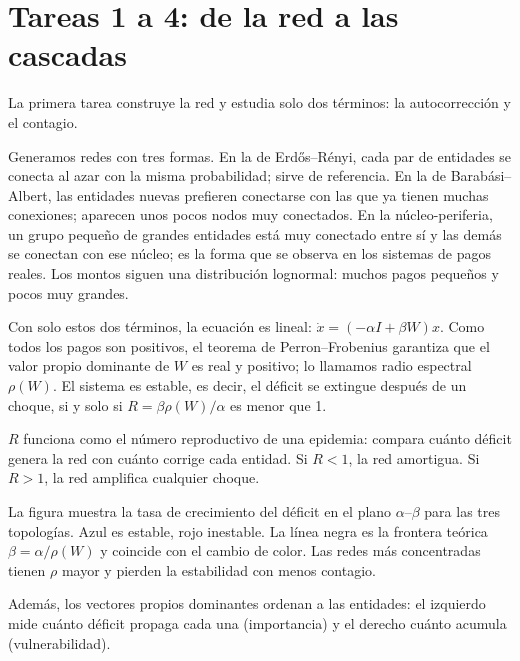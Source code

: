 \section{Tareas 1 a 4: de la red a las cascadas}

\begin{decir}
La primera tarea construye la red y estudia solo dos términos: la autocorrección y el
contagio.

Generamos redes con tres formas. En la de Erdős–Rényi, cada par de entidades se conecta
al azar con la misma probabilidad; sirve de referencia. En la de Barabási–Albert, las
entidades nuevas prefieren conectarse con las que ya tienen muchas conexiones; aparecen
unos pocos nodos muy conectados. En la núcleo-periferia, un grupo pequeño de grandes
entidades está muy conectado entre sí y las demás se conectan con ese núcleo; es la
forma que se observa en los sistemas de pagos reales. Los montos siguen una distribución
lognormal: muchos pagos pequeños y pocos muy grandes.

Con solo estos dos términos, la ecuación es lineal: $\dot x=(-\alpha I+\beta W)x$. Como
todos los pagos son positivos, el teorema de Perron–Frobenius garantiza que el valor
propio dominante de $W$ es real y positivo; lo llamamos radio espectral $\rho(W)$. El
sistema es estable, es decir, el déficit se extingue después de un choque, si y solo si
$R=\beta\rho(W)/\alpha$ es menor que 1.

$R$ funciona como el número reproductivo de una epidemia: compara cuánto déficit genera
la red con cuánto corrige cada entidad. Si $R<1$, la red amortigua. Si $R>1$, la red
amplifica cualquier choque.

La figura muestra la tasa de crecimiento del déficit en el plano $\alpha$–$\beta$ para
las tres topologías. Azul es estable, rojo inestable. La línea negra es la frontera
teórica $\beta=\alpha/\rho(W)$ y coincide con el cambio de color. Las redes más
concentradas tienen $\rho$ mayor y pierden la estabilidad con menos contagio.

Además, los vectores propios dominantes ordenan a las entidades: el izquierdo mide
cuánto déficit propaga cada una (importancia) y el derecho cuánto acumula
(vulnerabilidad).
\end{decir}
